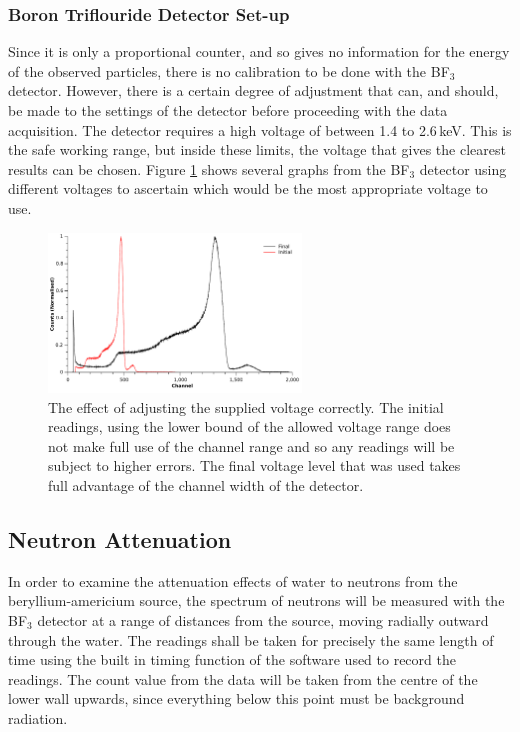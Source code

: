 \subsubsection{Boron Triflouride Detector Set-up} %
\label{ssub:boron_triflouride_detector_set_up}
Since it is only a proportional counter, and so gives no information for the energy of the observed particles, there is no calibration to be done with the BF$_3$ detector. However, there is a certain degree of adjustment that can, and should, be made to the settings of the detector before proceeding with the data acquisition. The detector requires a high voltage of between 1.4 to 2.6\,keV. This is the safe working range, but inside these limits, the voltage that gives the clearest results can be chosen. Figure \ref{fig:bf3voltages} shows several graphs from the BF$_3$ detector using different voltages to ascertain which would be the most appropriate voltage to use.
\begin{figure}[ht]
  \centering
  \includegraphics[width=0.6\textwidth]{BF3_calib_voltage.pdf}
  \caption{The effect of adjusting the supplied voltage correctly. The initial readings, using the lower bound of the allowed voltage range does not make full use of the channel range and so any readings will be subject to higher errors. The final voltage level that was used takes full advantage of the channel width of the detector. \label{fig:bf3voltages}}
\end{figure}

\subsection{Neutron Attenuation} %
\label{sub:neutron_attenuation}In order to examine the attenuation effects of water to neutrons from the beryllium-americium source, the spectrum of neutrons will be measured with the BF$_3$ detector at a range of distances from the source, moving radially outward through the water. The readings shall be taken for precisely the same length of time using the built in timing function of the software used to record the readings. The count value from the data will be taken from the centre of the lower wall upwards, since everything below this point must be background radiation.

